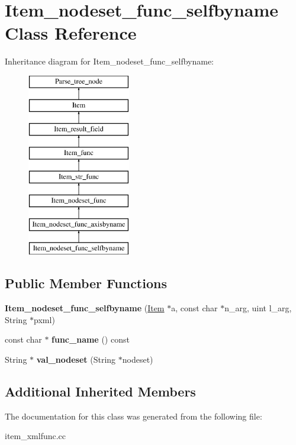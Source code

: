 \hypertarget{classItem__nodeset__func__selfbyname}{}\section{Item\+\_\+nodeset\+\_\+func\+\_\+selfbyname Class Reference}
\label{classItem__nodeset__func__selfbyname}
Inheritance diagram for Item\+\_\+nodeset\+\_\+func\+\_\+selfbyname\+:\begin{figure}[H]
\begin{center}
\leavevmode
\includegraphics[height=8.000000cm]{classItem__nodeset__func__selfbyname}
\end{center}
\end{figure}
\subsection*{Public Member Functions}
\begin{DoxyCompactItemize}
\item 
\mbox{\label{classItem__nodeset__func__selfbyname_a12b8d26fcd5717cdcc75585d4c12041d}} 
{\bfseries Item\+\_\+nodeset\+\_\+func\+\_\+selfbyname} (\mbox{\hyperlink{classItem}{Item}} $\ast$a, const char $\ast$n\+\_\+arg, uint l\+\_\+arg, String $\ast$pxml)
\item 
\mbox{\label{classItem__nodeset__func__selfbyname_aeaf34397246ecb6e760156b16d7ee6db}} 
const char $\ast$ {\bfseries func\+\_\+name} () const
\item 
\mbox{\label{classItem__nodeset__func__selfbyname_afffd2c9dddb7131d95f1187c4e5758ae}} 
String $\ast$ {\bfseries val\+\_\+nodeset} (String $\ast$nodeset)
\end{DoxyCompactItemize}
\subsection*{Additional Inherited Members}


The documentation for this class was generated from the following file\+:\begin{DoxyCompactItemize}
\item 
item\+\_\+xmlfunc.\+cc\end{DoxyCompactItemize}
